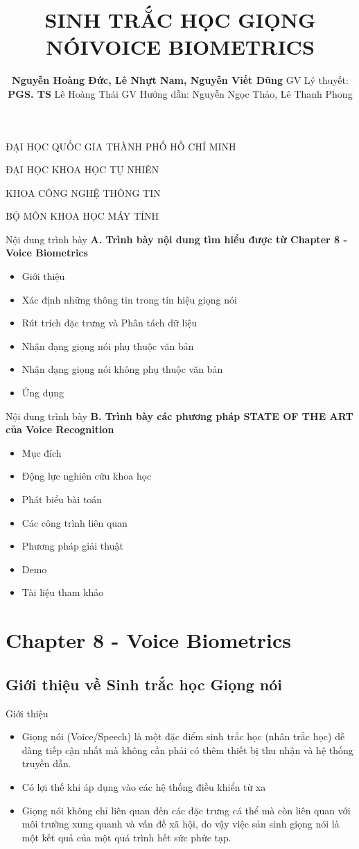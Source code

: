 \documentclass[notheorems, aspectratio=54]{beamer}
\author{\textbf{Nguyễn Hoàng Đức, Lê Nhựt Nam, Nguyễn Viết Dũng}\newline\newline
	GV Lý thuyết: \textbf{PGS. TS} Lê Hoàng Thái\newline
	GV Hướng dẫn: Nguyễn Ngọc Thảo, Lê Thanh Phong}
\title{SINH TRẮC HỌC GIỌNG NÓI\newline VOICE BIOMETRICS}
\begin{document}
\begin{frame}
	\centering
	ĐẠI HỌC QUỐC GIA THÀNH PHỐ HỒ CHÍ MINH
	
	ĐẠI HỌC KHOA HỌC TỰ NHIÊN
	
	KHOA CÔNG NGHỆ THÔNG TIN
	
	BỘ MÔN KHOA HỌC MÁY TÍNH
	\titlepage
\end{frame}
\begin{frame}{Nội dung trình bày}
	\textbf{A. Trình bày nội dung tìm hiểu được từ Chapter 8 - Voice Biometrics}
	\begin{itemize}
		\item Giới thiệu
		\item Xác định những thông tin trong tín hiệu giọng nói
		\item Rút trích đặc trưng và Phân tách dữ liệu
		\item Nhận dạng giọng nói phụ thuộc văn bản
		\item Nhận dạng giọng nói không phụ thuộc văn bản
		\item Ứng dụng
	\end{itemize}
\end{frame}
\begin{frame}{Nội dung trình bày}
	\textbf{B. Trình bày các phương pháp STATE OF THE ART của Voice Recognition}
	\begin{itemize}
		\item Mục đích
		\item Động lực nghiên cứu khoa học 
		\item Phát biểu bài toán
		\item Các công trình liên quan
		\item Phương pháp giải thuật
		\item Demo
		\item Tài liệu tham khảo
	\end{itemize}
\end{frame}

\section{Chapter 8 - Voice Biometrics}
\subsection{Giới thiệu về Sinh trắc học Giọng nói}
\begin{frame}{Giới thiệu}
	\begin{itemize}
		\item Giọng nói (Voice/Speech) là một đặc điểm sinh trắc học (nhân trắc học) dễ dàng tiếp cận nhất mà không cần phải có thêm thiết bị thu nhận và hệ thống truyền dẫn.
		\item Có lợi thế khi áp dụng vào các hệ thống điều khiển từ xa
		\item Giọng nói không chỉ liên quan đến các đặc trưng cá thể mà còn liên quan với môi trường xung quanh và vấn đề xã hội, do vậy việc sản sinh giọng nói là một kết quả của một quá trình hết sức phức tạp.
	\end{itemize}
\end{frame}
\end{document}
